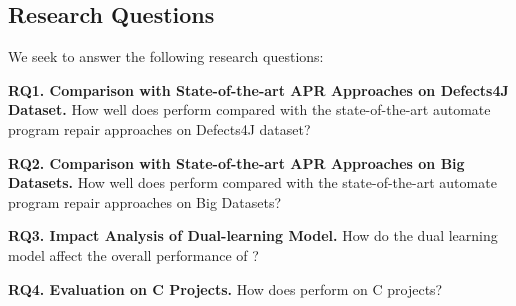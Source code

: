 \subsection{Research Questions}

We seek to answer the following research questions:

\noindent\textbf{RQ1. Comparison with State-of-the-art APR Approaches on Defects4J Dataset.}  How well does {\tool} perform compared with the state-of-the-art automate program repair approaches on Defects4J dataset?


\noindent\textbf{RQ2. Comparison with State-of-the-art APR Approaches on Big Datasets.}  How well does {\tool} perform compared with the state-of-the-art automate program repair approaches on Big Datasets?


\noindent\textbf{RQ3. Impact Analysis of Dual-learning Model.} How do the dual learning model affect the overall performance of {\tool}?


\noindent\textbf{RQ4. Evaluation on C Projects.} How does {\tool} perform on C projects?